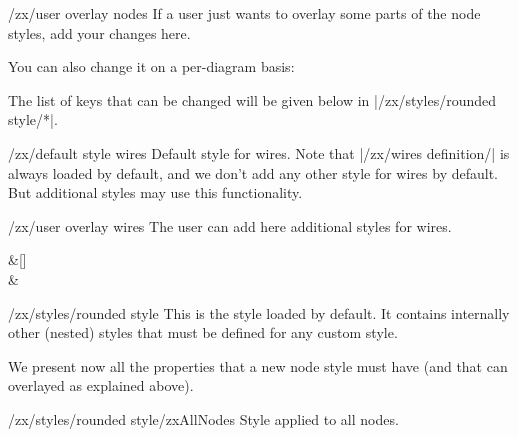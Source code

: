 \documentclass[a4paper]{ltxdoc}
\begin{document}
\begin{stylekey}{/zx/user overlay nodes}
  If a user just wants to overlay some parts of the node styles, add your changes here.
\begin{codeexample}[]
  {
    \zx{\zxNone{} \rar & \zxH{} \rar & \zxNone{}}
  }
\end{codeexample}
You can also change it on a per-diagram basis:
\begin{codeexample}[]
\end{codeexample}
The list of keys that can be changed will be given below in |/zx/styles/rounded style/*|.
\end{stylekey}

\begin{stylekey}{/zx/default style wires}
  Default style for wires. Note that |/zx/wires definition/| is always loaded by default, and we don't add any other style for wires by default. But additional styles may use this functionality.
\end{stylekey}

\begin{stylekey}{/zx/user overlay wires}
  The user can add here additional styles for wires.
\begin{codeexample}[]
\begin{ZX}[/zx/user overlay wires/.style={thick,->,C/.append style={dashed}}]
  \zxNone{} \ar[d,C] \rar[] &[\zxWCol] \zxNone{}\\[\zxWRow]
  \zxNone{} \rar[] & \zxNone{}
\end{ZX}
\end{codeexample}
\end{stylekey}

\begin{stylekey}{/zx/styles/rounded style}
  This is the style loaded by default. It contains internally other (nested) styles that must be defined for any custom style.
\end{stylekey}

We present now all the properties that a new node style must have (and that can overlayed as explained above).
\begin{stylekey}{/zx/styles/rounded style/zxAllNodes}
  Style applied to all nodes.
\end{stylekey}
\end{document}
